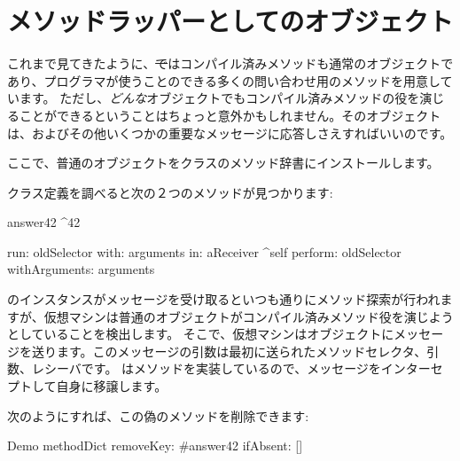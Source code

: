 \documentclass[a4paper,10pt,twoside]{book}
\begin{document}
\section{メソッドラッパーとしてのオブジェクト}

これまで見てきたように、\st ではコンパイル済みメソッドも通常のオブジェクトであり、プログラマが使うことのできる多くの問い合わせ用のメソッドを用意しています。
ただし、\emph{どんな}オブジェクトでもコンパイル済みメソッドの役を演じることができるということはちょっと意外かもしれません。そのオブジェクトは、およびその他いくつかの重要なメッセージに応答しさえすればいいのです。


ここで、普通のオブジェクトをクラスのメソッド辞書にインストールします。


クラス定義を調べると次の２つのメソッドが見つかります:
\begin{code}{}
answer42
	^42

run: oldSelector with: arguments in: aReceiver
	^self perform: oldSelector withArguments: arguments
\end{code}

のインスタンスがメッセージを受け取るといつも通りにメソッド探索が行われますが、仮想マシンは普通のオブジェクトがコンパイル済みメソッド役を演じようとしていることを検出します。
そこで、仮想マシンはオブジェクトにメッセージを送ります。このメッセージの引数は最初に送られたメソッドセレクタ、引数、レシーバです。
はメソッドを実装しているので、メッセージをインターセプトして自身に移譲します。

次のようにすれば、この偽のメソッドを削除できます:
\begin{code}{}
Demo methodDict removeKey: #answer42 ifAbsent: []
\end{code}
\end{document}
